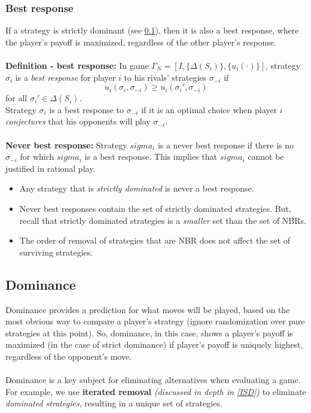 \documentclass{article}
\begin{document}
\subsubsection{Best response}
If a strategy is strictly dominant (see \ref{dom}), then it is also a best response, where the player's payoff is maximized, regardless of the other player's response. \\
\\
\noindent \textbf{Definition - best response:} In game \(\Gamma_N = [I, \{\Delta(S_i)\}, \{u_i(\cdot)\}]\), strategy \(\sigma_i\) is a \textit{best response} for player \(i\) to his rivals' strategies \(\sigma_{-i}\) if
\[
u_i(\sigma_i, \sigma_{-i}) \geq u_i(\sigma_i', \sigma_{-i})
\]
for all \(\sigma_i' \in \Delta(S_i)\).
\\
\noindent Strategy \(\sigma_i\) is a best response to \(\sigma_{-i}\) if it is an optimal choice when player \(i\) \textit{conjectures} that his opponents will play \(\sigma_{-i}\).
\\
\\
\noindent \textbf{Never best response:} Strategy $sigma_i$ is a never best response if there is no $\sigma_{-i}$ for which $sigma_i$ is a best response. This implies that $sigma_i$ cannot be justified in rational play. 
\begin{itemize}
    \item Any strategy that is \textit{strictly dominated} is never a best response.
    \item Never best responses contain the set of strictly dominated strategies. But, recall that strictly dominated strategies is a \textit{smaller} set than the set of NBRs. 
    \item The order of removal of strategies that are NBR does not affect the set of surviving strategies. 
\end{itemize}


\subsection{Dominance}\label{dom}

\noindent Dominance provides a prediction for what moves will be played, based on the most obvious way to compare a player's strategy (ignore randomization over pure strategies at this point). So, dominance, in this case, shows a player's payoff is maximized (in the case of strict dominance) if player's payoff is uniquely highest, regardless of the opponent's move. \\ 
\\
Dominance is a key subject for eliminating alternatives when evaluating a game. For example, we use \textbf{iterated removal} \textit{(discussed in depth in \ref{ISD})} to eliminate \textit{dominated strategies}, resulting in a unique set of strategies. \\
\end{document}
